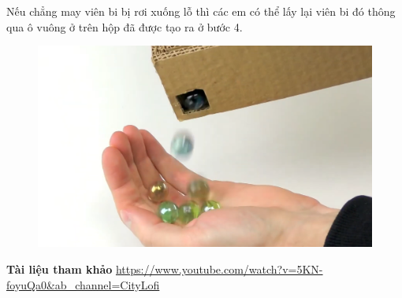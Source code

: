 \begin{multicols}{2}
\begin{figure}[H]
		\vspace*{-10pt}
	\end{figure}
	Nếu chẳng may viên bi bị rơi xuống lỗ thì các em có thể lấy lại viên bi đó thông qua ô vuông ở trên hộp đã được tạo ra ở bước 4.
	\begin{figure}[H]
		\vspace*{-5pt}
		\centering
		\captionsetup{labelformat= empty, justification=centering}
		\includegraphics[width= 0.9\linewidth]{22}
		\vspace*{-10pt}
	\end{figure}
	\textbf{\color{toancuabi}Tài liệu tham khảo}
	\vskip 0.1cm
	\url{https://www.youtube.com/watch?v=5KN-foyuQa0&ab_channel=CityLofi}
\end{multicols}

